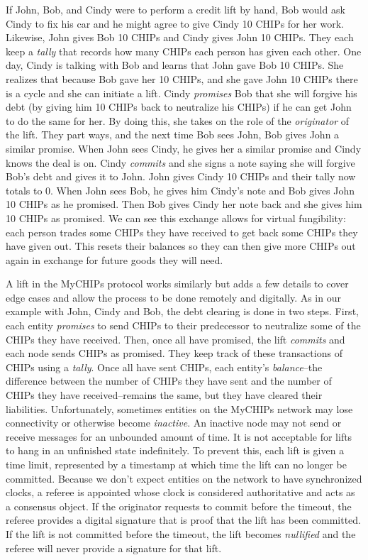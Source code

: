 \documentclass[article, onecolumn, 12pt]{IEEEtran}
\begin{document}
If John, Bob, and Cindy were to perform a credit lift by hand, Bob would ask Cindy to fix his car and he might agree to give Cindy 10 CHIPs for her work. Likewise, John gives Bob 10 CHIPs and Cindy gives John 10 CHIPs. They each keep a \emph{tally} that records how many CHIPs each person has given each other. One day, Cindy is talking with Bob and learns that John gave Bob 10 CHIPs. She realizes that because Bob gave her 10 CHIPs, and she gave John 10 CHIPs there is a cycle and she can initiate a lift. Cindy \emph{promises} Bob that she will forgive his debt (by giving him 10 CHIPs back to neutralize his CHIPs) if he can get John to do the same for her. By doing this, she takes on the role of the \emph{originator} of the lift. They part ways, and the next time Bob sees John, Bob gives John a similar promise. When John sees Cindy, he gives her a similar promise and Cindy knows the deal is on. Cindy \emph{commits} and she signs a note saying she will forgive Bob's debt and gives it to John. John gives Cindy 10 CHIPs and their tally now totals to 0. When John sees Bob, he gives him Cindy's note and Bob gives John 10 CHIPs as he promised. Then Bob gives Cindy her note back and she gives him 10 CHIPs as promised. We can see this exchange allows for virtual fungibility: each person trades some CHIPs they have received to get back some CHIPs they have given out. 
This resets their balances so they can then give more CHIPs out again in exchange for future goods they will need. 

A lift in the MyCHIPs protocol works similarly but adds a few details to cover edge cases and allow the process to be done remotely and digitally.
As in our example with John, Cindy and Bob, the debt clearing is done in two steps. First, each entity \emph{promises} to send CHIPs to their predecessor to neutralize some of the CHIPs they have received. Then, once all have promised, the lift \emph{commits} and each node sends CHIPs as promised. They keep track of these transactions of CHIPs using a \emph{tally}. Once all have sent CHIPs, each entity's \emph{balance}--the difference between the number of CHIPs they have sent and the number of CHIPs they have received--remains the same, but they have cleared their liabilities. Unfortunately, sometimes entities on the MyCHIPs network may lose connectivity or otherwise become \emph{inactive}. An inactive node may not send or receive messages for an unbounded amount of time. It is not acceptable for lifts to hang in an unfinished state indefinitely. To prevent this, each lift is given a time limit, represented by a timestamp at which time the lift can no longer be committed. Because we don't expect entities on the network to have synchronized clocks, a referee is appointed whose clock is considered authoritative and acts as a consensus object. If the originator requests to commit before the timeout, the referee provides a digital signature that is proof that the lift has been committed. If the lift is not committed before the timeout, the lift becomes \emph{nullified} and the referee will never provide a signature for that lift.
\end{document}
